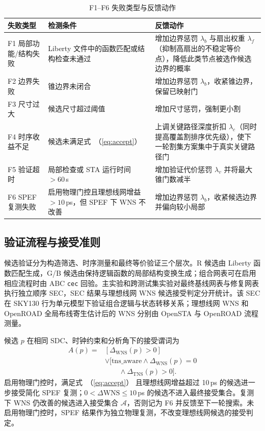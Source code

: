 \documentclass[twocolumn,10pt,fontset=windows]{ctexart}
\renewcommand{\eqref}[1]{\textup{（\ref{#1}）}}
\begin{document}
\begin{table}[!htbp]
\centering
\caption{F1--F6 失败类型与反馈动作}
\label{tab:failures}
\scriptsize
\setlength{\tabcolsep}{2pt}
\begin{tabular}{p{2.0cm}p{2.6cm}p{2.9cm}}
\toprule
\textbf{失败类型} & \textbf{检测条件} & \textbf{反馈动作} \\
\midrule
F1 局部功能/结构失败 & Liberty 文件中的函数匹配或结构检查未通过 & 增加边界惩罚 $\lambda_b$ 与扇出权重 $\lambda_f$（抑制高扇出的不稳定等价点），降低此类节点被选作候选边界的概率 \\
F2 边界失败 & 锥边界未闭合 & 增加边界惩罚 $\lambda_b$，收紧锥边界，保留已映射门 \\
F3 尺寸过大 & 候选尺寸超过阈值 & 增加尺寸惩罚，强制更小割 \\
F4 时序收益不足 & 候选未满足式~\eqref{eq:accept} & 上调关键路径深度折扣 $\lambda_c$（同时提高覆盖割排序优先级），使下一轮割集方案集中于真实关键路径门 \\
F5 验证超时 & 局部检查或 STA 运行时间 $>60\,$s & 增加验证代价惩罚 $\lambda_v$ 并将最大锥门数减半 \\
F6 SPEF 复测失败 & 启用物理门控且理想线网增益 $>10\,$ps，但 SPEF 下 WNS 不改善 & 增加边界惩罚 $\lambda_b$，收紧候选边界并偏向较小局部 \\
\bottomrule
\end{tabular}
\end{table}

\FloatBarrier
\subsection{验证流程与接受准则}\label{sec:validation}
候选验证分为构造筛选、时序测量和最终等价验证三个层次。R 候选由 Liberty 函数匹配生成，G/B 候选由保持逻辑函数的局部结构变换生成；组合网表可在启用相应流程时由 ABC \texttt{cec} 回验。主实验和跨测试集实验对最终基线网表与修复网表执行独立顺序 SEC，SEC 结果与理想线网 WNS 候选接受判定分开统计。该 SEC 在 SKY130 行为单元模型下验证组合逻辑与状态转移关系；理想线网 WNS 和 OpenROAD 全局布线寄生估计后的 WNS 分别由 OpenSTA 与 OpenROAD 流程测量。

候选 $p$ 在相同 SDC、时钟约束和分析角下的接受谓词为
\begin{equation}
\label{eq:accept}
\begin{aligned}
A(p)={}&[\Delta_{\mathrm{WNS}}(p)>0]\\
&\lor[\mathrm{tns\_aware}\land\Delta_{\mathrm{WNS}}(p)=0\\
&\qquad\land\Delta_{\mathrm{TNS}}(p)>0].
\end{aligned}
\end{equation}
启用物理门控时，满足式~\eqref{eq:accept} 且理想线网增益超过 10\,ps 的候选进一步接受简化 SPEF 复测；$0<\Delta\mathrm{WNS}\le10\,$ps 的候选不进入最终接受集合。复测下 WNS 仍改善的候选进入接受集合 $\mathcal{A}$，否则记为 F6 并反馈至下一轮搜索。未启用物理门控时，SPEF 结果作为独立物理复测，不改变理想线网候选的接受判定。
\end{document}
